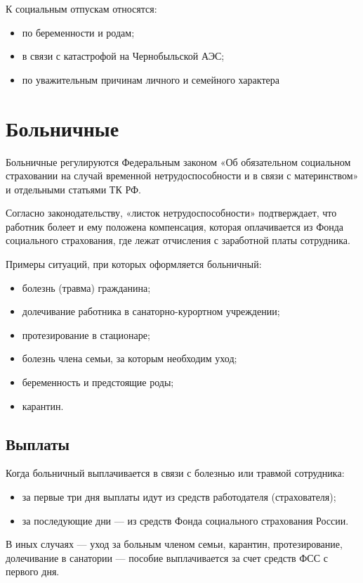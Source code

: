 \documentclass[14pt,a4paper]{extarticle}
\begin{document}
К социальным отпускам относятся:
\begin{itemize}
	\item по беременности и родам;
	\item в связи с катастрофой на Чернобыльской АЭС;
	\item по уважительным причинам личного и семейного характера
\end{itemize}


\section{Больничные}
Больничные регулируются Федеральным законом «Об обязательном социальном страховании на случай временной нетрудоспособности и в связи с материнством» и отдельными статьями ТК РФ. 

Согласно законодательству, «листок нетрудоспособности» подтверждает, что работник болеет и ему положена компенсация, которая оплачивается из Фонда социального страхования, где лежат отчисления с заработной платы сотрудника. 

Примеры ситуаций, при которых оформляется больничный:
\begin{itemize}
	\item болезнь (травма) гражданина;
	\item долечивание работника в санаторно-курортном учреждении;
	\item протезирование в стационаре;
	\item болезнь члена семьи, за которым необходим уход;
	\item беременность и предстоящие роды;
	\item карантин.
\end{itemize}

\subsection {Выплаты}

Когда больничный выплачивается в связи с болезнью или травмой сотрудника:
\begin{itemize}
	\item за первые три дня выплаты идут из средств работодателя (страхователя);
	\item за последующие дни — из средств Фонда социального страхования России.
\end{itemize}


В иных случаях — уход за больным членом семьи, карантин, протезирование, долечивание в санатории — пособие выплачивается за счет средств ФСС с первого дня.
\end{document}
